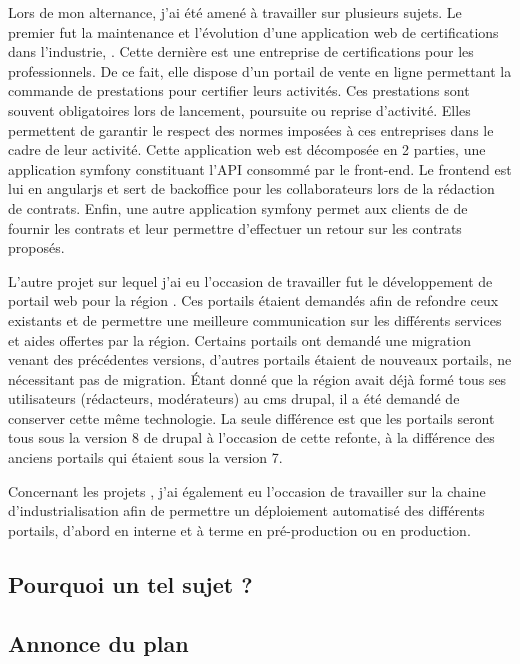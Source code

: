 Lors de mon alternance, j'ai été amené à travailler sur plusieurs sujets. Le premier fut la maintenance et l'évolution d'une application web de certifications dans l'industrie, \bv. Cette dernière est une entreprise de certifications pour les professionnels. De ce fait, elle dispose d’un portail de vente en ligne permettant la commande de prestations pour certifier leurs activités. Ces prestations sont souvent obligatoires lors de lancement, poursuite ou reprise d'activité. Elles permettent de garantir le respect des normes imposées à ces entreprises dans le cadre de leur activité. Cette application web est décomposée en 2 parties, une application \gls{symfony} constituant l'\gls{API} consommé par le front-end. Le \gls{frontend} est lui en \gls{angularjs} et sert de \gls{backoffice} pour les collaborateurs \bv{} lors de la rédaction de contrats. Enfin, une autre application \gls{symfony} permet aux clients de \bv{} de fournir les contrats et leur permettre d'effectuer un retour sur les contrats proposés.

L'autre projet sur lequel j'ai eu l'occasion de travailler fut le développement de portail web pour la région \naq{}. Ces portails étaient demandés afin de refondre ceux existants et de permettre une meilleure communication sur les différents services et aides offertes par la région. Certains portails ont demandé une migration venant des précédentes versions, d'autres portails étaient de nouveaux portails, ne nécessitant pas de migration. Étant donné que la région avait déjà formé tous ses utilisateurs (rédacteurs, modérateurs) au \gls{cms} \gls{drupal}, il a été demandé de conserver cette même technologie. La seule différence est que les portails seront tous sous la version 8 de \gls{drupal} à l'occasion de cette refonte, à la différence des anciens portails qui étaient sous la version 7. 

Concernant les projets \naq, j'ai également eu l'occasion de travailler sur la chaine d'industrialisation afin de permettre un déploiement automatisé des différents portails, d'abord en interne et à terme en pré-production ou en production.

\subsection*{Pourquoi un tel sujet ?}


\subsection*{Annonce du plan}

